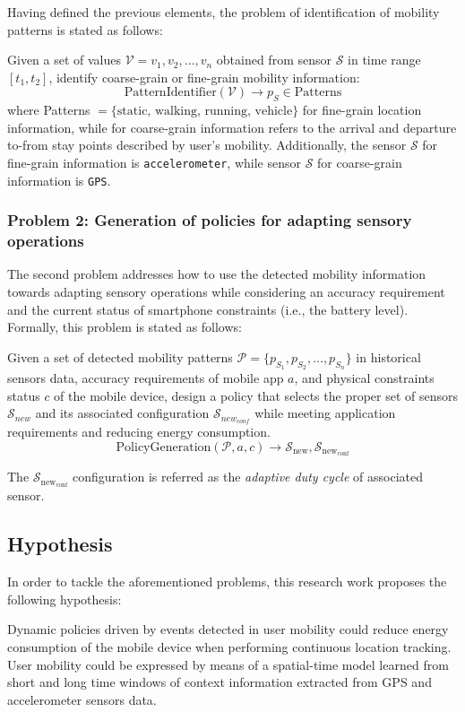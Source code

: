 \documentclass[ENG,PhD]{cinvestav}
\begin{document}
Having defined the previous elements, the problem of identification of mobility patterns is stated as follows:
\begin{displayquote}
Given a set of values $\mathcal{V} = v_1,v_2,\ldots,v_n$ obtained from sensor $\mathcal{S}$ in time range $[t_1,t_2]$, identify coarse-grain or fine-grain mobility information:
$$
\text{PatternIdentifier}(\mathcal{V}) \rightarrow p_S \in \text{Patterns}
$$
where Patterns  $ = \{ \text{static, walking, running, vehicle} \}$ for fine-grain location information, while for coarse-grain information refers to the arrival and departure to-from stay points described by user's mobility.
Additionally, the sensor $\mathcal{S}$ for fine-grain information is \verb|accelerometer|, while sensor $\mathcal{S}$ for coarse-grain information is \verb|GPS|.
\end{displayquote}

\subsubsection{Problem 2: Generation of policies for adapting sensory operations}
\label{sub:problem-statement-problem-two}
The second problem addresses how to use the detected mobility information towards adapting sensory operations while considering an accuracy requirement and the current status of smartphone constraints (i.e., the battery level).
Formally, this problem is stated as follows:

\begin{displayquote}
Given a set of detected mobility patterns $\mathcal{P} = \{ p_{S_1}, p_{S_2}, \ldots, p_{S_n} \}$ in historical sensors data, accuracy requirements of mobile app $a$, and physical constraints status $c$ of the mobile device, design a policy that selects the proper set of sensors $\mathcal{S}_{new}$ and its associated configuration $\mathcal{S}_{new_{conf}}$  while meeting application requirements and reducing energy consumption.
$$
  \text{PolicyGeneration}( \mathcal{P}, a, c ) \longrightarrow{} \mathcal{S}_{\text{new}}, \mathcal{S}_{\text{new}_{\text{conf}}}
$$

The $\mathcal{S}_{\text{new}_{\text{conf}}}$ configuration is referred as the \emph{adaptive duty cycle} of associated sensor.
\end{displayquote}


\subsection{Hypothesis}
In order to tackle the aforementioned problems, this research work proposes the following hypothesis:
\begin{displayquote}
  Dynamic policies driven by events detected in user mobility could reduce energy consumption of the mobile device when performing continuous location tracking.
  User mobility could be expressed by means of a spatial-time model learned from short and long time windows of context information extracted from GPS and accelerometer sensors data.
\end{displayquote}
\end{document}
